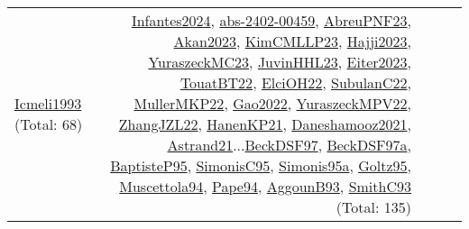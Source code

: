 {\begin{longtable}{p{3cm}r>{\raggedright\arraybackslash}p{6cm}>{\raggedright\arraybackslash}p{6cm}>{\raggedright\arraybackslash}p{8cm}}
\hyperref[detail:Icmeli1993]{Icmeli1993} (Total: 68) & \hyperref[detail:Infantes2024]{Infantes2024}, \hyperref[detail:abs-2402-00459]{abs-2402-00459}, \hyperref[detail:AbreuPNF23]{AbreuPNF23}, \hyperref[detail:Akan2023]{Akan2023}, \hyperref[detail:KimCMLLP23]{KimCMLLP23}, \hyperref[detail:Hajji2023]{Hajji2023}, \hyperref[detail:YuraszeckMC23]{YuraszeckMC23}, \hyperref[detail:JuvinHHL23]{JuvinHHL23}, \hyperref[detail:Eiter2023]{Eiter2023}, \hyperref[detail:TouatBT22]{TouatBT22}, \hyperref[detail:ElciOH22]{ElciOH22}, \hyperref[detail:SubulanC22]{SubulanC22}, \hyperref[detail:MullerMKP22]{MullerMKP22}, \hyperref[detail:Gao2022]{Gao2022}, \hyperref[detail:YuraszeckMPV22]{YuraszeckMPV22}, \hyperref[detail:ZhangJZL22]{ZhangJZL22}, \hyperref[detail:HanenKP21]{HanenKP21}, \hyperref[detail:Daneshamooz2021]{Daneshamooz2021}, \hyperref[detail:Astrand21]{Astrand21}...\hyperref[detail:BeckDSF97]{BeckDSF97}, \hyperref[detail:BeckDSF97a]{BeckDSF97a}, \hyperref[detail:BaptisteP95]{BaptisteP95}, \hyperref[detail:SimonisC95]{SimonisC95}, \hyperref[detail:Simonis95a]{Simonis95a}, \hyperref[detail:Goltz95]{Goltz95}, \hyperref[detail:Muscettola94]{Muscettola94}, \hyperref[detail:Pape94]{Pape94}, \hyperref[detail:AggounB93]{AggounB93}, \hyperref[detail:SmithC93]{SmithC93} (Total: 135)\\

\end{longtable}}
